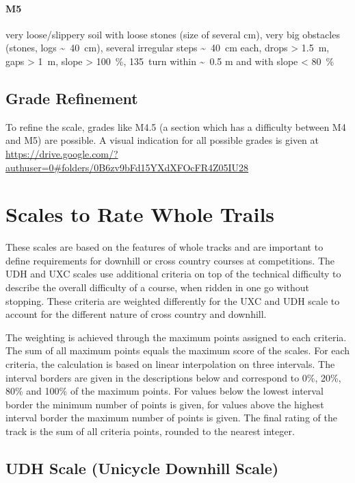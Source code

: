 \documentclass[a4paper,oneside]{scrartcl}
\begin{document}
\paragraph{M5}
\hangindent=1cm
very loose/slippery soil with loose stones (size of several cm),
very big obstacles (stones, logs \textasciitilde\ 40~cm),
several irregular steps \textasciitilde\ 40~cm each,
drops > 1.5~m, gaps > 1~m,
slope > 100~\%,
135\textdegree\ turn within \textasciitilde\ 0.5 m and with slope < 80~\%

\subsection{Grade Refinement}
To refine the scale, grades like M4.5 (a section which has a difficulty between
M4 and M5) are possible.
A visual indication for all possible grades is given at
\url{https://drive.google.com/?authuser=0#folders/0B6zv9bFd15YXdXFOcFR4Z05IU28}

\section{Scales to Rate Whole Trails}
\label{sec:muni-difficulty-udh-uxc}

These scales are based on the features of whole tracks and are important to
define requirements for downhill or cross country courses at competitions.
The UDH and UXC scales use additional criteria on top of the technical difficulty
to describe the overall difficulty of a course, when ridden in one go without stopping.
These criteria are weighted differently for the UXC and UDH scale to account for the
different nature of cross country and downhill.

The weighting is achieved through the maximum points assigned to each criteria. The sum
of all maximum points equals the maximum score of the scales.
For each criteria, the calculation is based on linear interpolation on three intervals.
The interval borders are given in the descriptions below and correspond to 0\%,
20\%, 80\% and 100\% of the maximum points.
For values below the lowest interval border the minimum number of points is
given, for values above the highest interval border the maximum number of points
is given.
The final rating of the track is the sum of all criteria points, rounded to the nearest integer.

\subsection{UDH Scale (Unicycle Downhill Scale)}
\label{sec:udh-scale}
\end{document}
